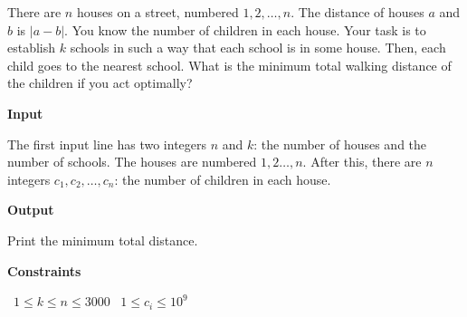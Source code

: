 There are $n$ houses on a street, numbered $1,2,\dots,n$. The distance of houses $a$ and $b$ is $|a-b|$. You know the number of children in each house.
Your task is to establish $k$ schools in such a way that each school is in some house. Then, each child goes to the nearest school. What is the minimum total walking distance of the children if you act optimally?

\vspace{0.3cm}\noindent\textbf{Input}

The first input line has two integers $n$ and $k$: the number of houses and the number of schools. The houses are numbered $1,2\dots,n$.
After this, there are $n$ integers $c_1,c_2,\dots,c_n$: the number of children in each house.

\vspace{0.3cm}\noindent\textbf{Output}

Print the minimum total distance.

\vspace{0.3cm}\noindent\textbf{Constraints}

\textbullet\ $1 \le k \le n \le 3000$
\textbullet\ $1 \le c_i \le 10^9$